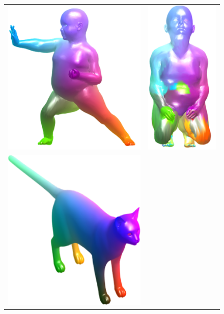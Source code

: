 \begin{figure}[tb]
	\centering
	\setlength\tabcolsep{0.5pt}
	\begin{tabular}{cc}
		\includegraphics[scale=0.7]{figures/FailTopBase.png} &
		\includegraphics[scale=0.7]{figures/FailTopmatch.png} \\
		\includegraphics[scale=0.6]{figures/cat_base.png} &

\end{tabular}
\end{figure}
